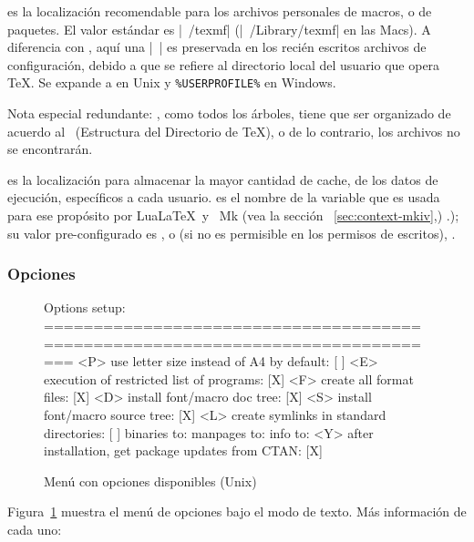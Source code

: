 \documentclass{article}
\begin{document}
 es la localización recomendable para los archivos
personales de macros, o de paquetes. El valor estándar es |~/texmf| (|~/Library/texmf| en las Macs). A
diferencia con , aquí una |~| es preservada en los
recién escritos archivos de configuración, debido a que se refiere al
directorio local del usuario que opera \TeX. Se expande a
 en Unix y \verb|%USERPROFILE%| en Windows.  

Nota especial redundante:
, como todos los árboles, tiene que ser organizado
de acuerdo al \TDS\ (Estructura del Directorio de \TeX{}), o de lo
contrario, los archivos no se encontrarán. 

 es la localización para almacenar la mayor cantidad
de cache, de los datos de ejecución, específicos a cada usuario.
 es el nombre de la variable que es usada para ese
propósito por Lua\LaTeX\ y \ConTeXt\ Mk (vea la
sección~ \ref{sec:context-mkiv},) \p.\pageref{sec:context-mkiv}); su
valor pre-configurado es , o (si no es permisible en
los permisos de escritos), .

\subsubsection{Opciones}
\label{sec:options}

\begin{figure}[tbh]
\begin{boxedverbatim}
Options setup:
===============================================================================
 <P> use letter size instead of A4 by default: [ ]
 <E> execution of restricted list of programs: [X]
 <F> create all format files:                  [X]
 <D> install font/macro doc tree:              [X]
 <S> install font/macro source tree:           [X]
 <L> create symlinks in standard directories:  [ ]
            binaries to:
            manpages to:
                info to:
 <Y> after installation, get package updates from CTAN: [X]
\end{boxedverbatim}
\caption{Menú con opciones disponibles (Unix)}\label{fig:options-text}
\end{figure}

Figura~\ref{fig:options-text} muestra el menú de opciones bajo el modo de texto. 
Más información de cada uno:
\end{document}
